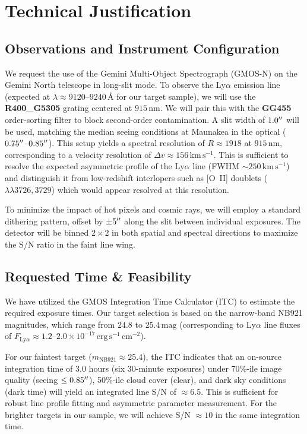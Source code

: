 \section{Technical Justification}

\subsection{Observations and Instrument Configuration}
We request the use of the Gemini Multi-Object Spectrograph (GMOS-N) on the Gemini North telescope in long-slit mode. To observe the Ly$\alpha$ emission line (expected at $\lambda \approx 9120$--$9240\,\text{\AA}$ for our target sample), we will use the \textbf{R400\_G5305} grating centered at $915\,\text{nm}$. We will pair this with the \textbf{GG455} order-sorting filter to block second-order contamination. A slit width of $1.0^{\prime\prime}$ will be used, matching the median seeing conditions at Maunakea in the optical ($0.75^{\prime\prime}$--$0.85^{\prime\prime}$). This setup yields a spectral resolution of $R \approx 1918$ at $915\,\text{nm}$, corresponding to a velocity resolution of $\Delta v \approx 156\,\text{km}\,\text{s}^{-1}$. This is sufficient to resolve the expected asymmetric profile of the Ly$\alpha$ line (FWHM $\sim 250\,\text{km}\,\text{s}^{-1}$) and distinguish it from low-redshift interlopers such as [O~II] doublets ($\lambda\lambda 3726, 3729$) which would appear resolved at this resolution.

To minimize the impact of hot pixels and cosmic rays, we will employ a standard dithering pattern, offset by $\pm 5^{\prime\prime}$ along the slit between individual exposures. The detector will be binned $2 \times 2$ in both spatial and spectral directions to maximize the S/N ratio in the faint line wing.

\subsection{Requested Time \& Feasibility}
We have utilized the GMOS Integration Time Calculator (ITC) to estimate the required exposure times. Our target selection is based on the narrow-band NB921 magnitudes, which range from $24.8$ to $25.4\,\text{mag}$ (corresponding to Ly$\alpha$ line fluxes of $F_{\text{Ly}\alpha} \approx 1.2$--$2.0 \times 10^{-17}\,\text{erg}\,\text{s}^{-1}\,\text{cm}^{-2}$).

For our faintest target ($m_{\text{NB921}} \approx 25.4$), the ITC indicates that an on-source integration time of 3.0 hours (six 30-minute exposures) under 70\%-ile image quality (seeing $\le 0.85^{\prime\prime}$), 50\%-ile cloud cover (clear), and dark sky conditions (dark time) will yield an integrated line S/N of $\approx 6.5$. This is sufficient for robust line profile fitting and asymmetric parameter measurement. For the brighter targets in our sample, we will achieve S/N $\approx 10$ in the same integration time.

